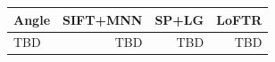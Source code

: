 \begin{tabular}{lrrr}
\toprule
Angle & SIFT+MNN & SP+LG & LoFTR \\
\midrule
TBD & TBD & TBD & TBD \\
\bottomrule
\end{tabular}